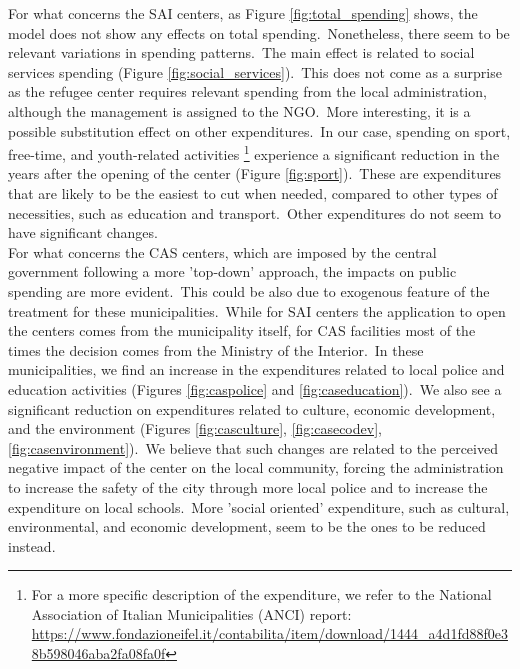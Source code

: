 \documentclass[authoryear,preprint,review,12pt]{elsarticle}
\begin{document}
\noindent
For what concerns the SAI centers, as Figure \ref{fig:total_spending} shows, the model does not show any effects on total spending.\ Nonetheless, there seem to be relevant variations in spending patterns.\ The main effect is related to social services spending (Figure \ref{fig:social_services}).\ This does not come as a surprise as the refugee center requires relevant spending from the local administration, although the management is assigned to the NGO.\ More interesting, it is a possible substitution effect on other expenditures.\ In our case, spending on sport, free-time, and youth-related activities \footnote{For a more specific description of the expenditure, we refer to the National Association of Italian Municipalities (ANCI) report: \url{https://www.fondazioneifel.it/contabilita/item/download/1444_a4d1fd88f0e38b598046aba2fa08fa0f}} experience a significant reduction in the years after the opening of the center (Figure \ref{fig:sport}).\ These are expenditures that are likely to be the easiest to cut when needed, compared to other types of necessities, such as education and transport.\ Other expenditures do not seem to have significant changes.\\ 

\noindent
For what concerns the CAS centers, which are imposed by the central government following a more 'top-down' approach, the impacts on public spending are more evident.\ This could be also due to exogenous feature of the treatment for these municipalities.\ While for SAI centers the application to open the centers comes from the municipality itself, for CAS facilities most of the times the decision comes from the Ministry of the Interior.\ In these municipalities, we find an increase in the expenditures related to local police and education activities (Figures \ref{fig:caspolice} and \ref{fig:caseducation}).\ We also see a significant reduction on expenditures related to culture, economic development, and the environment (Figures \ref{fig:casculture}, \ref{fig:casecodev}, \ref{fig:casenvironment}).\ We believe that such changes are related to the perceived negative impact of the center on the local community, forcing the administration to increase the safety of the city through more local police and to increase the expenditure on local schools.\ More 'social oriented' expenditure, such as cultural, environmental, and economic development, seem to be the ones to be reduced instead.\\ 


\end{document}
